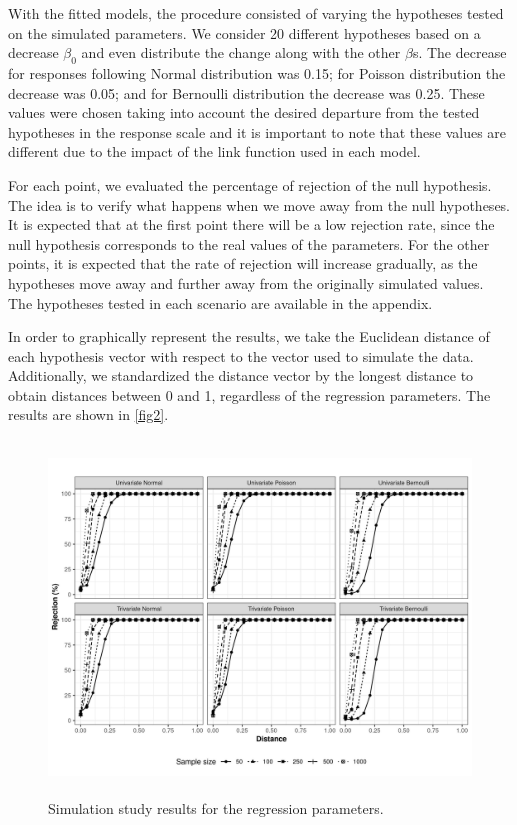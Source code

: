 \documentclass[Review,sagev,times, doublespace]{sagej}
\begin{document}
With the fitted models, the procedure consisted of varying the hypotheses tested on the simulated parameters. We consider 20 different hypotheses based on a decrease $\beta_0$ and even distribute the change along with the other $\beta$s. The decrease for responses following Normal distribution was 0.15; for Poisson distribution the decrease was 0.05; and for Bernoulli distribution the decrease was 0.25. These values were chosen taking into account the desired departure from the tested hypotheses in the response scale and it is important to note that these values are different due to the impact of the link function used in each model.

For each point, we evaluated the percentage of rejection of the null hypothesis. The idea is to verify what happens when we move away from the null hypotheses. It is expected that at the first point there will be a low rejection rate, since the null hypothesis corresponds to the real values of the parameters. For the other points, it is expected that the rate of rejection will increase gradually, as the hypotheses move away and further away from the originally simulated values. The hypotheses tested in each scenario are available in the appendix.
 
In order to graphically represent the results, we take the Euclidean distance of each hypothesis vector with respect to the vector used to simulate the data. Additionally, we standardized the distance vector by the longest distance to obtain distances between 0 and 1, regardless of the regression parameters. The results are shown in \autoref{fig2}.

\begin{figure}[h]
\centering
\includegraphics[width=29.6pc,height=22.2pc]{FIGURE2.jpeg}
\caption{Simulation study results for the regression parameters.\label{fig2}}
\end{figure}
\end{document}
